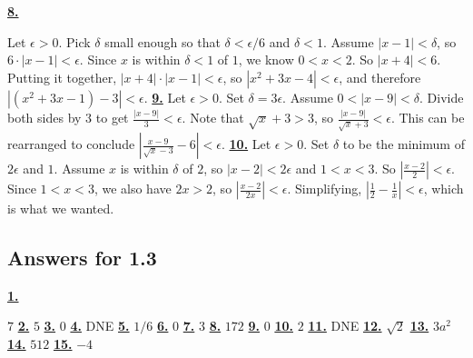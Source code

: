 \hypertarget {a:1.2.8}{\hyperlink {e:1.2.8}{\bfseries 8.}} \mdseries Let $\epsilon > 0$. Pick $\delta $ small enough so that $\delta < \epsilon / 6$ and $\delta < 1$. Assume $|x - 1| < \delta $, so $6 \cdot |x - 1| < \epsilon $. Since $x$ is within $\delta < 1$ of $1$, we know $0 < x < 2$. So $|x+4| < 6$. Putting it together, $|x+4| \cdot |x-1| < \epsilon $, so $|x^2 + 3x - 4| < \epsilon $, and therefore $|(x^2 + 3x - 1) - 3| < \epsilon $.\qquad 
\hypertarget {a:1.2.9}{\hyperlink {e:1.2.9}{\bfseries 9.}} \mdseries Let $\epsilon > 0$. Set $\delta = 3\epsilon $. Assume $0 < |x-9| < \delta $. Divide both sides by $3$ to get $\frac {|x-9|}{3} < \epsilon $. Note that $\sqrt {x}+3 > 3$, so $\frac {|x-9|}{\sqrt {x} + 3} < \epsilon $. This can be rearranged to conclude $\left |\frac {x-9}{\sqrt {x} - 3} - 6\right | < \epsilon $.\qquad 
\hypertarget {a:1.2.10}{\hyperlink {e:1.2.10}{\bfseries 10.}} \mdseries Let $\epsilon > 0$. Set $\delta $ to be the minimum of $2\epsilon $ and $1$. Assume $x$ is within $\delta $ of $2$, so $|x - 2| < 2 \epsilon $ and $1 < x < 3$. So $\left | \frac {x-2}{2} \right | < \epsilon $. Since $1 < x < 3$, we also have $2x > 2$, so $\left | \frac {x-2}{2x} \right | < \epsilon $. Simplifying, $\left | \frac {1}{2} - \frac {1}{x} \right | < \epsilon $, which is what we wanted.\qquad 
\subsection *{Answers for 1.3}
\hypertarget {a:1.3.1}{\hyperlink {e:1.3.1}{\bfseries 1.}} \mdseries $7$\qquad 
\hypertarget {a:1.3.2}{\hyperlink {e:1.3.2}{\bfseries 2.}} \mdseries $5$\qquad 
\hypertarget {a:1.3.3}{\hyperlink {e:1.3.3}{\bfseries 3.}} \mdseries $0$\qquad 
\hypertarget {a:1.3.4}{\hyperlink {e:1.3.4}{\bfseries 4.}} \mdseries DNE\qquad 
\hypertarget {a:1.3.5}{\hyperlink {e:1.3.5}{\bfseries 5.}} \mdseries $1/6$\qquad 
\hypertarget {a:1.3.6}{\hyperlink {e:1.3.6}{\bfseries 6.}} \mdseries $0$\qquad 
\hypertarget {a:1.3.7}{\hyperlink {e:1.3.7}{\bfseries 7.}} \mdseries $3$\qquad 
\hypertarget {a:1.3.8}{\hyperlink {e:1.3.8}{\bfseries 8.}} \mdseries $172$\qquad 
\hypertarget {a:1.3.9}{\hyperlink {e:1.3.9}{\bfseries 9.}} \mdseries $0$\qquad 
\hypertarget {a:1.3.10}{\hyperlink {e:1.3.10}{\bfseries 10.}} \mdseries $2$\qquad 
\hypertarget {a:1.3.11}{\hyperlink {e:1.3.11}{\bfseries 11.}} \mdseries DNE\qquad 
\hypertarget {a:1.3.12}{\hyperlink {e:1.3.12}{\bfseries 12.}} \mdseries $\sqrt 2$\qquad 
\hypertarget {a:1.3.13}{\hyperlink {e:1.3.13}{\bfseries 13.}} \mdseries $3a^2$\qquad 
\hypertarget {a:1.3.14}{\hyperlink {e:1.3.14}{\bfseries 14.}} \mdseries $512$\qquad 
\hypertarget {a:1.3.15}{\hyperlink {e:1.3.15}{\bfseries 15.}} \mdseries $-4$\qquad 
